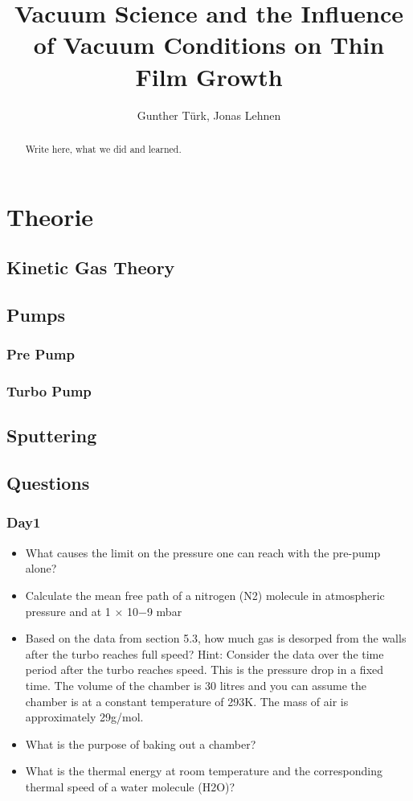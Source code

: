 \documentclass[]{article}
\title{Vacuum Science and the Inﬂuence of Vacuum Conditions on Thin Film Growth}
\author{Gunther Türk, Jonas Lehnen}
\begin{document}
\maketitle
\tableofcontents
\begin{abstract}
Write here, what we did and learned.
\end{abstract}

\section{Theorie}
\subsection{Kinetic Gas Theory}
\subsection{Pumps}
\subsubsection{Pre Pump}
\subsubsection{Turbo Pump}
\subsection{Sputtering}
\subsection{Questions}
\subsubsection{Day1}
\begin{itemize}  
	\item What causes the limit on the pressure one can reach with the pre-pump alone? 
	\item  Calculate the mean free path of a nitrogen (N2) molecule in atmospheric pressure and at 1 × 10−9 mbar 
	\item Based on the data from section 5.3, how much gas is desorped from the walls after the turbo reaches full speed? Hint: Consider the data over the time period after the turbo reaches speed. This is the pressure drop in a ﬁxed time. The volume of the chamber is 30 litres and you can assume the chamber is at a constant temperature of 293K. The mass of air is approximately 29g/mol.
	 

	\item What is the purpose of baking out a chamber? 
	\item What is the thermal energy at room temperature and the corresponding thermal speed of a water molecule (H2O)?
\end{itemize}
\end{document}
